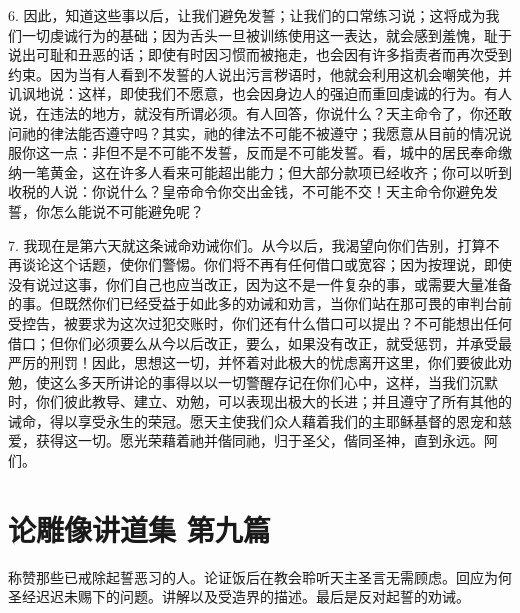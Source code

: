 6. 因此，知道这些事以后，让我们避免发誓；让我们的口常练习说；这将成为我们一切虔诚行为的基础；因为舌头一旦被训练使用这一表达，就会感到羞愧，耻于说出可耻和丑恶的话；即使有时因习惯而被拖走，也会因有许多指责者而再次受到约束。因为当有人看到不发誓的人说出污言秽语时，他就会利用这机会嘲笑他，并讥讽地说：这样，即使我们不愿意，也会因身边人的强迫而重回虔诚的行为。有人说，在违法的地方，就没有所谓必须。有人回答，你说什么？天主命令了，你还敢问祂的律法能否遵守吗？其实，祂的律法不可能不被遵守；我愿意从目前的情况说服你这一点：非但不是不可能不发誓，反而是不可能发誓。看，城中的居民奉命缴纳一笔黄金，这在许多人看来可能超出能力；但大部分款项已经收齐；你可以听到收税的人说：你说什么？皇帝命令你交出金钱，不可能不交！天主命令你避免发誓，你怎么能说不可能避免呢？\par

7. 我现在是第六天就这条诫命劝诫你们。从今以后，我渴望向你们告别，打算不再谈论这个话题，使你们警惕。你们将不再有任何借口或宽容；因为按理说，即使没有说过这事，你们自己也应当改正，因为这不是一件复杂的事，或需要大量准备的事。但既然你们已经受益于如此多的劝诫和劝言，当你们站在那可畏的审判台前受控告，被要求为这次过犯交账时，你们还有什么借口可以提出？不可能想出任何借口；但你们必须要么从今以后改正，要么，如果没有改正，就受惩罚，并承受最严厉的刑罚！因此，思想这一切，并怀着对此极大的忧虑离开这里，你们要彼此劝勉，使这么多天所讲论的事得以以一切警醒存记在你们心中，这样，当我们沉默时，你们彼此教导、建立、劝勉，可以表现出极大的长进；并且遵守了所有其他的诫命，得以享受永生的荣冠。愿天主使我们众人藉着我们的主耶稣基督的恩宠和慈爱，获得这一切。愿光荣藉着祂并偕同祂，归于圣父，偕同圣神，直到永远。阿们。\par



\section{论雕像讲道集 第九篇}

称赞那些已戒除起誓恶习的人。论证饭后在教会聆听天主圣言无需顾虑。回应为何圣经迟迟未赐下的问题。讲解以及受造界的描述。最后是反对起誓的劝诫。\par

